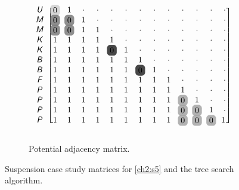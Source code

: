 \begin{figure}
\begin{subfigure}[b]{\columnwidth}
\begin{align*}
{\begin{blockarray}{cccccccccccccc}
\begin{block}{c[ccccccccccccc]}
\xcolor{U} & \hlight{0}{20} & 1 & \cdot & \cdot & \cdot & \cdot & \cdot & \cdot & \cdot & \cdot & \cdot & \cdot & \cdot \\
\xcolor{M} &	\hlight{0}{55} & \hlight{0}{55} & 1 & \cdot & \cdot & \cdot & \cdot & \cdot & \cdot & \cdot & \cdot & \cdot & \cdot \\
\xcolor{M} &	\hlight{0}{55} & \hlight{0}{55} & 1 & 1 & \cdot & \cdot & \cdot & \cdot & \cdot & \cdot & \cdot & \cdot & \cdot \\
\xcolor{K} &	1 & 1 & 1 & 1 & 1 & \cdot & \cdot & \cdot & \cdot & \cdot & \cdot & \cdot & \cdot \\
\xcolor{K} &	1 & 1 & 1 & 1 & \hlight{0}{90} & 1 & \cdot & \cdot & \cdot & \cdot & \cdot & \cdot & \cdot \\
\xcolor{B} &	1 & 1 & 1 & 1 & 1 & 1 &	1 & \cdot & \cdot & \cdot & \cdot & \cdot & \cdot \\
\xcolor{B} &	1 & 1 & 1 & 1 & 1 & 1 &	\hlight{0}{90} & 1 & \cdot & \cdot & \cdot & \cdot & \cdot \\
\xcolor{F} &	1 & 1 & 1 & 1 & 1 & 1 &	1 & 1 & 1 & \cdot & \cdot & \cdot & \cdot \\
\xcolor{P} &	1 & 1 & 1 & 1 & 1 & 1 &	1 & 1 & 1 & 1 & \cdot & \cdot & \cdot \\
\xcolor{P} &	1 & 1 & 1 & 1 & 1 & 1 &	1 & 1 & 1 & \hlight{0}{37.5} & 1 & \cdot & \cdot \\
\xcolor{P} &	1 & 1 & 1 & 1 & 1 & 1 & 1 &	1 & 1 & \hlight{0}{37.5} & \hlight{0}{37.5} & 1 & \cdot \\
\xcolor{P} &	1 & 1 & 1 & 1 & 1 & 1 & 1 & 1 &	1 & \hlight{0}{37.5} & \hlight{0}{37.5} & \hlight{0}{37.5} & \tikzmark{bottom}{1}\ \\
\end{block}
\end{blockarray}
}
\end{align*}
\caption{Potential adjacency matrix.\label{fig:ch2:suspension2_2}}
\end{subfigure}
\caption{Suspension case study matrices for \ref{ch2:s5} and the tree search algorithm.\label{fig:ch2:suspension2}}
\end{figure}